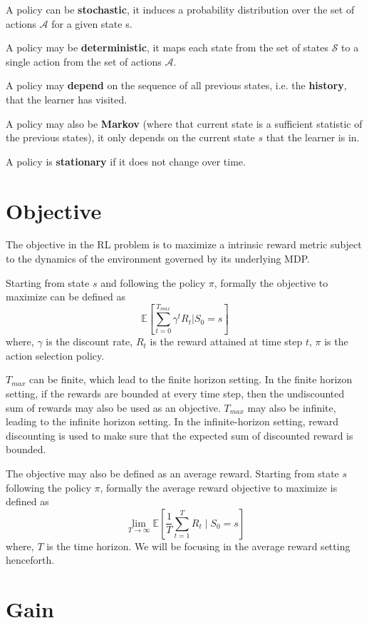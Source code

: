 A policy can be \textbf{stochastic}, it induces a probability distribution over the set of actions $\mathcal{A}$ for a given state s.

A policy may be \textbf{deterministic}, it maps each state from the set of states $\mathcal{S}$ to a single action from the set of actions $\mathcal{A}$.

A policy may \textbf{depend} on the sequence of all previous states, i.e. the \textbf{history}, that the learner has visited. 

A policy may also be \textbf{Markov} (where that current state is a sufficient statistic of the previous states), it only depends on the current state $s$ that the learner is in.

A policy is \textbf{stationary} if it does not change over time.

\section{Objective}

The objective in the RL problem is to maximize a intrinsic reward metric subject to the dynamics of the environment governed by its underlying MDP.

Starting from state $s$ and following the policy $\pi$, formally the objective to maximize can be defined as
$$\mathbb{E}\left[\sum_{t=0}^{T_{max}} \gamma^t R_t | S_0 = s\right]$$
where, $\gamma$ is the discount rate, $R_t$ is the reward attained at time step $t$, $\pi$ is the action selection policy.

$T_{max}$ can be finite, which lead to the finite horizon setting. 
In the finite horizon setting, if the rewards are bounded at every time step, then the undiscounted sum of rewards may also be used as an objective.
$T_{max}$ may also be infinite, leading to the infinite horizon setting.
In the infinite-horizon setting, reward discounting is used to make sure that the expected sum of discounted reward is bounded.

The objective may also be defined as an average reward.
Starting from state $s$ following the policy $\pi$, formally the average reward objective to maximize is defined as
$$\lim_{T \to \infty} \mathbb{E}\left[\frac{1}{T} \sum_{t=1}^{T} R_t \mid S_0 = s\right]$$
where, $T$ is the time horizon.
We will be focusing in the average reward setting henceforth.

\section{Gain}

